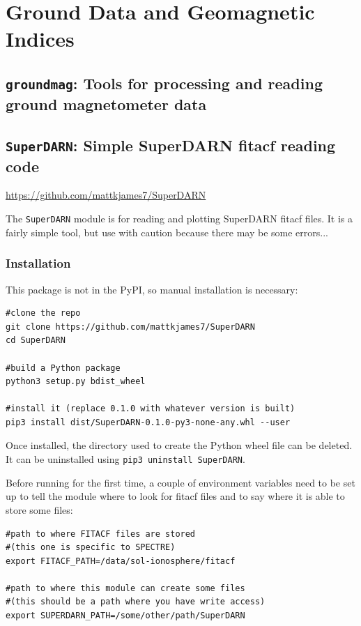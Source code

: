 \chapter{Ground Data and Geomagnetic Indices}

	\section{\texttt{groundmag}: Tools for processing and reading ground magnetometer data}
	
	\section{\texttt{SuperDARN}: Simple SuperDARN fitacf reading code}

		\href{https://github.com/mattkjames7/SuperDARN}{https://github.com/mattkjames7/SuperDARN}

		The \texttt{SuperDARN} module is for reading and plotting SuperDARN fitacf files. It is a fairly simple tool, but use with caution because there may be some errors...

		\subsection{Installation}

			This package is not in the PyPI, so manual installation is necessary:
			\begin{verbatim}
#clone the repo
git clone https://github.com/mattkjames7/SuperDARN
cd SuperDARN

#build a Python package
python3 setup.py bdist_wheel

#install it (replace 0.1.0 with whatever version is built)
pip3 install dist/SuperDARN-0.1.0-py3-none-any.whl --user
			\end{verbatim}
			
			Once installed, the directory used to create the Python wheel file can be deleted. It can be uninstalled using \texttt{pip3 uninstall SuperDARN}.

			Before running for the first time, a couple of environment variables need to be set up to tell the module where to look for fitacf files and to say where it is able to store some files:
			\begin{verbatim}
#path to where FITACF files are stored 
#(this one is specific to SPECTRE)
export FITACF_PATH=/data/sol-ionosphere/fitacf
	
#path to where this module can create some files
#(this should be a path where you have write access)
export SUPERDARN_PATH=/some/other/path/SuperDARN
			\end{verbatim}

